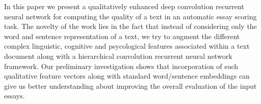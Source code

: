 In this paper we present a qualitatively enhanced deep convolution recurrent neural network for computing the quality of a text in an automatic essay scoring task. The novelty of the work lies in the fact that instead of considering only the word and sentence representation of a text, we try to augment the different complex linguistic, cognitive and psycological features associated within a text document along with a hierarchical convolution recurrent neural network framework.  Our preliminary investigation shows that incorporation of such qualitative feature vectors along with standard word/sentence embeddings can give us better understanding about improving the overall evaluation of the input essays.
